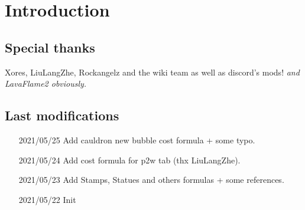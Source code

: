 \chapter{Introduction}
    \newline
    \newline

    \section{Special thanks}
    Xores, LiuLangZhe, Rockangelz and the wiki team as well as discord's mods!
    \newline
    \newline
    \textit{and LavaFlame2 obviously.}
    \section{Last modifications}
        \begin{itemize}
            \item[2021/05/25] Add cauldron new bubble cost formula + some typo.
            \item[2021/05/24] Add cost formula for p2w tab (thx LiuLangZhe).
            \item[2021/05/23] Add Stamps, Statues and others formulas + some references. 
            \item[2021/05/22] Init
        \end{itemize}